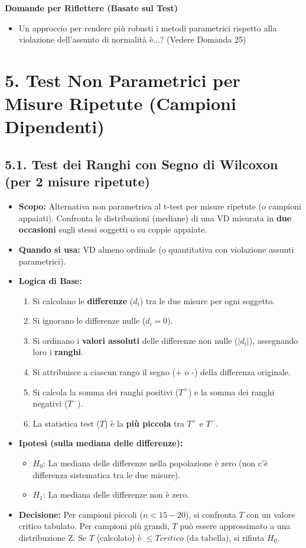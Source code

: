 \documentclass[12pt, a4paper]{article}
\newenvironment{reflectionbox}{%
    \medskip
    \begin{framed}\par\noindent
    \textbf{\color{boxtitlecolor}Domande per Riflettere (Basate sul Test)} \par
    \begin{itemize}[leftmargin=*, label=$\blacktriangleright$]
}{%
    \end{itemize}\par
    \end{framed}
    \medskip
}
\newcommand{\Hnull}{H_0} %
\newcommand{\Halt}{H_1} %
\newcommand{\TWilc}{T} %
\begin{document}
\begin{reflectionbox}
    \item Un approccio per rendere più robusti i metodi parametrici rispetto alla violazione dell'assunto di normalità è...? (Vedere Domanda 25)
\end{reflectionbox}

\section*{5. Test Non Parametrici per Misure Ripetute (Campioni Dipendenti)}

\subsection*{5.1. Test dei Ranghi con Segno di Wilcoxon (per 2 misure ripetute)}
\begin{itemize}
    \item \textbf{Scopo:} Alternativa non parametrica al t-test per misure ripetute (o campioni appaiati). Confronta le distribuzioni (mediane) di una VD misurata in \textbf{due occasioni} sugli stessi soggetti o su coppie appaiate.
    \item \textbf{Quando si usa:} VD almeno ordinale (o quantitativa con violazione assunti parametrici).
    \item \textbf{Logica di Base:}
        \begin{enumerate}
            \item Si calcolano le \textbf{differenze} ($d_i$) tra le due misure per ogni soggetto.
            \item Si ignorano le differenze nulle ($d_i=0$).
            \item Si ordinano i \textbf{valori assoluti} delle differenze non nulle ($|d_i|$), assegnando loro i \textbf{ranghi}.
            \item Si attribuisce a ciascun rango il segno (+ o -) della differenza originale.
            \item Si calcola la somma dei ranghi positivi ($T^+$) e la somma dei ranghi negativi ($T^-$).
            \item La statistica test ($\TWilc$) è la \textbf{più piccola} tra $T^+$ e $T^-$.
        \end{enumerate}
    \item \textbf{Ipotesi (sulla mediana delle differenze):}
        \begin{itemize}
            \item $\Hnull$: La mediana delle differenze nella popolazione è zero (non c'è differenza sistematica tra le due misure).
            \item $\Halt$: La mediana delle differenze non è zero.
        \end{itemize}
    \item \textbf{Decisione:} Per campioni piccoli ($n < 15-20$), si confronta $\TWilc$ con un valore critico tabulato. Per campioni più grandi, $\TWilc$ può essere approssimato a una distribuzione Z. Se $\TWilc$ (calcolato) è $\le \TWilc{critico}$ (da tabella), si rifiuta $\Hnull$.
\end{itemize}
\end{document}
